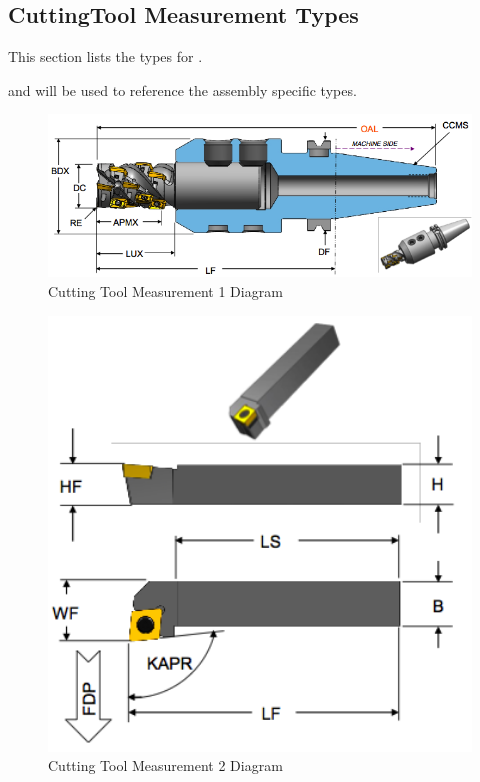 \subsection{CuttingTool Measurement Types} \label{sec:CuttingTool Measurement Types}


This section lists the  types for .

 and  will be used to reference the assembly specific  types.

\begin{figure}[ht]
  \centering
    \includegraphics[width=1.0\textwidth]{figures/Cutting Tool Measurement 1.png}
  \caption{Cutting Tool Measurement 1 Diagram}
  \label{fig:Cutting Tool Measurement 1 Diagram}
\end{figure}

\FloatBarrier


\begin{figure}[ht]
  \centering
    \includegraphics[width=1.0\textwidth]{figures/Cutting Tool Measurement 2.png}
  \caption{Cutting Tool Measurement 2 Diagram}
  \label{fig:Cutting Tool Measurement 2 Diagram}
\end{figure}

